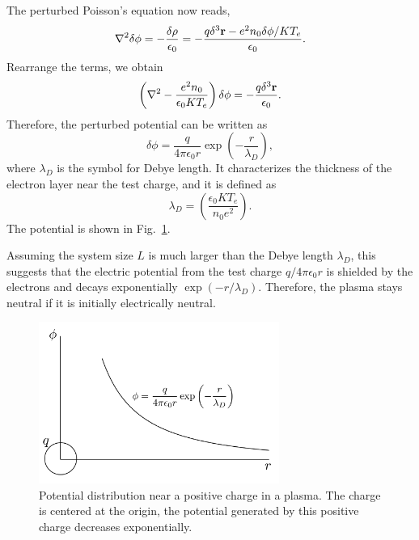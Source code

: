 The perturbed Poisson's equation now reads,
\begin{equation}
	\laplacian \delta\phi = - \frac{\delta \rho}{\epsilon_0} = - \frac{q\delta^3{\mathbf{r}} - e^2n_0\delta\phi/KT_e}{\epsilon_0}.
\end{equation}
Rearrange the terms, we obtain
\begin{equation}
	\left(\laplacian - \frac{e^2n_0}{\epsilon_0KT_e} \right)\delta\phi = -\frac{q\delta^3{\mathbf{r}}}{\epsilon_0}.
\end{equation}
Therefore, the perturbed potential can be written as
\begin{equation}
	\delta\phi = \frac{q}{4\pi\epsilon_0r}\exp(-\frac{r}{\lambda_D}),
\end{equation}
where $\lambda_D$ is the symbol for Debye length. It characterizes the thickness of the electron layer near the test charge, and it is defined as
\begin{equation}
	\lambda_D = \left(\frac{\epsilon_0KT_e}{n_0e^2}\right).
\end{equation}
The potential is shown in Fig.~\ref{fig:debye-potential}.

Assuming the system size $L$ is much larger than the Debye length $\lambda_D$, this suggests that the electric potential from the test charge $q/4\pi\epsilon_0r$ is shielded by the electrons and decays exponentially $\exp(-r/\lambda_D)$. Therefore, the plasma stays neutral if it is initially electrically neutral.

\begin{figure}[htbp]
	\centering
	\includegraphics[width=0.7\textwidth]{figures/debye-potential.png}
	\caption{Potential distribution near a positive charge in a plasma. The charge is centered at the origin, the potential generated by this positive charge decreases exponentially.}
	\label{fig:debye-potential}
\end{figure}

